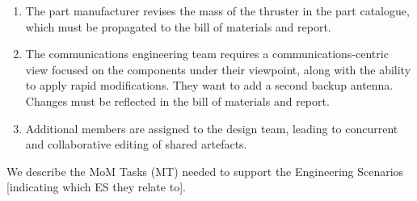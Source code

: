 \documentclass{article}
\begin{document}
\begin{enumerate}[label=\textbf{ES.\arabic*}, leftmargin=*]
   \item The part manufacturer revises the mass of the thruster in the part catalogue,
   which must be propagated to the bill of materials and report.

   \item The communications engineering team requires a communications-centric view
   focused on the components under their viewpoint, along with the ability
   to apply rapid modifications. They want to add a second backup antenna. Changes must be reflected in the bill of materials and report.

   \item Additional members are assigned to the design team, leading to
   concurrent and collaborative editing of shared artefacts.
\end{enumerate}

We describe the MoM Tasks (MT) needed to support the Engineering Scenarios
[indicating which ES they relate to].
\end{document}
